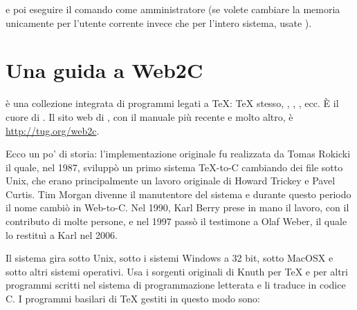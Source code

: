 \documentclass{article}
\begin{document}
\noindent e poi eseguire il comando  come
amministratore (se volete cambiare la memoria unicamente per l'utente
corrente invece che per l'intero sistema, usate ).


\section{Una guida a Web2C}

\Webc{} è una collezione integrata di programmi legati a \TeX: \TeX{}
stesso, \MF{}, \MP, \BibTeX{}, ecc. È il cuore di \TL{}. Il sito web di
\Webc{}, con il manuale più recente e molto altro, è
\url{http://tug.org/web2c}.

Ecco un po' di storia: l'implementazione originale fu realizzata da Tomas
Rokicki il quale, nel 1987, sviluppò un primo sistema \TeX{}-to-C
cambiando dei file sotto Unix, che erano principalmente un lavoro
originale di Howard Trickey e Pavel Curtis. Tim Morgan divenne il
manutentore del sistema e durante questo periodo il nome cambiò in
Web-to-C\@. Nel 1990, Karl Berry prese in mano il lavoro, con il
contributo di molte persone, e nel 1997 passò il testimone a Olaf Weber,
il quale lo restituì a Karl nel 2006.

Il sistema \Webc{} gira sotto Unix, sotto i sistemi Windows a 32 bit,
sotto MacOSX{} e sotto altri sistemi operativi. Usa i sorgenti originali
di Knuth per \TeX{} e per altri programmi scritti nel sistema di
programmazione letterata \web{} e li traduce in codice C. I programmi
basilari di \TeX{} gestiti in questo modo sono:
\end{document}
